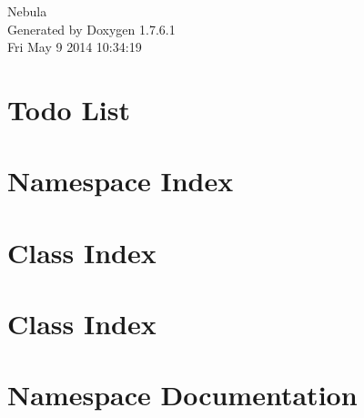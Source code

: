 \documentclass[a4paper]{book}
\begin{document}
\hypersetup{pageanchor=false,citecolor=blue}
\begin{titlepage}
\vspace*{7cm}
\begin{center}
{\Large \-Nebula }\\
\vspace*{1cm}
{\large \-Generated by Doxygen 1.7.6.1}\\
\vspace*{0.5cm}
{\small Fri May 9 2014 10:34:19}\\
\end{center}
\end{titlepage}
\clearemptydoublepage
{}
\tableofcontents
\clearemptydoublepage
{}
\hypersetup{pageanchor=true,citecolor=blue}
\chapter{\-Todo \-List}
\label{todo}
\hypertarget{todo}{}

\chapter{\-Namespace \-Index}

\chapter{\-Class \-Index}

\chapter{\-Class \-Index}

\chapter{\-Namespace \-Documentation}
















\end{document}
